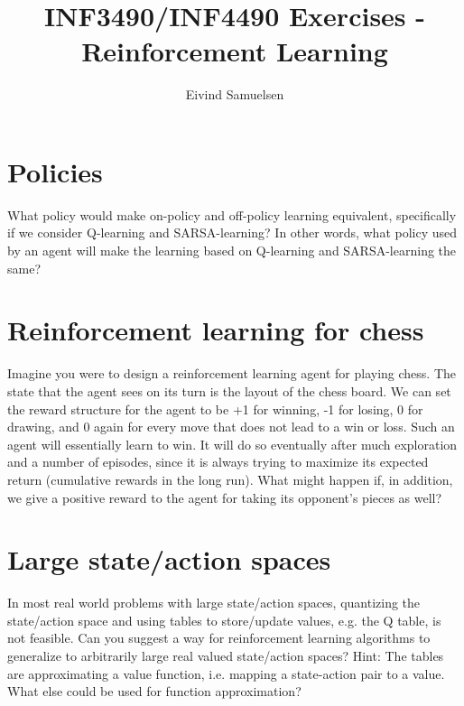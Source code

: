 
\title{\vspace{-2cm}INF3490/INF4490 Exercises - Reinforcement Learning}
\author{Eivind Samuelsen}
\date{}

\setlength\parindent{0pt}


    \renewcommand\marginsymbol[1][0pt]{%
  \tabto*{0cm}\makebox[-1cm][c]{$\mathbb{P}$}\tabto*{\TabPrevPos}}

\maketitle


\section{Policies}
What policy would make on-policy and off-policy learning equivalent,
specifically if we consider Q-learning and SARSA-learning?
In other words, what policy used by an agent will make the learning based on Q-learning and SARSA-learning the same?

\section{Reinforcement learning for chess}
Imagine you were to design a reinforcement learning agent for playing chess.
The state that the agent sees on its turn is the layout of the chess board.
We can set the reward structure for the agent to be +1 for winning, -1 for losing, 0 for drawing, and 0 again for every move that does not lead to a win or loss.
Such an agent will essentially learn to win.
It will do so eventually after much exploration and a number of episodes, since it is always trying to maximize its expected return (cumulative rewards in the long run).
What might happen if, in addition, we give a positive reward to the agent for taking its opponent's pieces as well?

\section{Large state/action spaces}
In most real world problems with large state/action spaces, quantizing the state/action space and using tables to store/update values, e.g. the Q table, is not feasible.
Can you suggest a way for reinforcement learning algorithms to generalize to arbitrarily large real valued state/action spaces?
Hint: The tables are approximating a value function, i.e. mapping a state-action pair to a value.
What else could be used for function approximation?



